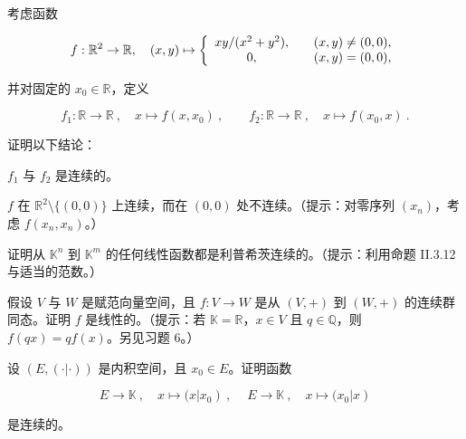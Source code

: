 \begin{exercises}
\item[11.]

考虑函数

\begin{equation*}
f:\mathbb{R}^{2}\to\mathbb{R},\quad(x,y)\mapsto\left\{\begin{array}{c l}{x y/(x^{2}+y^{2}),}&{\quad(x,y)\neq(0,0),}\\ {0,}&{\quad(x,y)=(0,0),}\\ \end{array}\right.
\end{equation*}

并对固定的 $ x_0 \in \mathbb{R} $，定义

\[
f_{1}\colon\mathbb{R}\to\mathbb{R}~,\quad x\mapsto f(x,x_{0})~,\qquad f_{2}\colon\mathbb{R}\to\mathbb{R}~,\quad x\mapsto f(x_{0},x)~.
\]

证明以下结论：

\begin{items}
\item

$ f_{1} $ 与 $ f_{2} $ 是连续的。

\item

$f$ 在 $\mathbb{R}^2 \setminus \{(0,0)\}$ 上连续，而在 $(0,0)$ 处不连续。（提示：对零序列 $(x_n)$，考虑 $f(x_n, x_n)$。）

\end{items}

\item[12.]

证明从 $ \mathbb{K}^n $ 到 $ \mathbb{K}^m $ 的任何线性函数都是利普希茨连续的。（提示：利用命题 II.3.12 与适当的范数。）

\item[13.]

假设 $V$ 与 $W$ 是赋范向量空间，且 $f: V \to W$ 是从 $(V,+)$ 到 $(W,+)$ 的连续群同态。证明 $f$ 是线性的。（提示：若 $\mathbb{K} = \mathbb{R}$，$x \in V$ 且 $q \in \mathbb{Q}$，则 $f(qx) = qf(x)$。另见习题 6。）

\item[14.]

设 $ (E, (\cdot|\cdot)) $ 是内积空间，且 $ x_0 \in E $。证明函数

\[
E\to\mathbb{K}~,\quad x\mapsto(x\left|x_{0}\right)~,~\quad E\to\mathbb{K}~,\quad x\mapsto(x_{0}\left|x\right)
\]

是连续的。

\item[15.]


\end{exercises}
